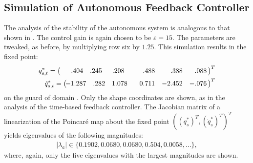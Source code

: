 \subsection{Simulation of Autonomous Feedback Controller} \noindent
The analysis of the stability of the autonomous system is analogous to that
shown in .
%
The control gain is again chosen to be $\varepsilon = 15$.
%
The parameters are tweaked, as before, by multiplying row six by $1.25$.
%
This simulation results in the fixed point:
%
\begin{align*}
  q_{s,t}^{*} =
  \left(\!\!\!\!\begin{array}{r r r r r r}
      \hphantom{1}-.404 & .245 & \hphantom{1}.208 & \hphantom{0}-.488 &
      \hphantom{-0}.388 & \hphantom{-}.088
  \end{array}\!\!\right)^T\\
  {\dot q}_{s,t}^{*} =
  \left(\!\!\!\!\begin{array}{r r r r r r}
    -1.287 & .282 & 1.078 & \hphantom{-}0.711 & -2.452 & -.076
  \end{array}\!\!\right)^T
\end{align*}
on the guard of domain {\DC}.
%
Only the shape coordinates are shown, as in the analysis of the time-based
feedback controller.
%
The Jacobian matrix of a linearization of the Poincar{\'e} map about the fixed
point $((q^*_s)^T, ({\dot q}^*_s)^T)^T$ yields eigenvalues of the following
magnitudes:
\begin{align*}
  |\lambda_a| \in \{0.1902, 0.0680, 0.0680, 0.504, 0.0058, \ldots\},
\end{align*}
where, again, only the five eigenvalues with the largest magnitudes are shown.
